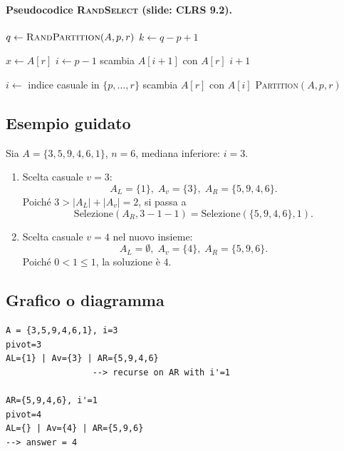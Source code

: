 \paragraph{Pseudocodice \textsc{RandSelect} (slide: CLRS 9.2).}
\begin{algorithm}[H]
	\caption{\textsc{RandSelect}$(A,p,r,i)$}
	$q\gets\textsc{RandPartition}(A,p,r)$\;
	$k\gets q-p+1$\;
\end{algorithm}

\begin{algorithm}[H]
	\caption{\textsc{Partition}$(A,p,r)$}
	$x\gets A[r]$\;
	$i\gets p-1$\;
	scambia $A[i+1]$ con $A[r]$\;
	\Return $i+1$\;
\end{algorithm}

\begin{algorithm}[H]
	\caption{\textsc{RandPartition}$(A,p,r)$}
	$i\gets$ indice casuale in $\{p,\ldots,r\}$\;
	scambia $A[r]$ con $A[i]$\;
	\Return \textsc{Partition}$(A,p,r)$\;
\end{algorithm}

\subsection{Esempio guidato}
Sia $A=\{3,5,9,4,6,1\}$, $n=6$, mediana inferiore: $i=3$.
\begin{enumerate}
	\item Scelta casuale $v=3$:
	\[
	A_L=\{1\},\;A_v=\{3\},\;A_R=\{5,9,4,6\}.
	\]
	Poiché $3>|A_L|+|A_v|=2$, si passa a
	\[
	\text{Selezione}(A_R,3-1-1)=\text{Selezione}(\{5,9,4,6\},1).
	\]
	\item Scelta casuale $v=4$ nel nuovo insieme:
	\[
	A_L=\emptyset,\;A_v=\{4\},\;A_R=\{5,9,6\}.
	\]
	Poiché $0<1\le1$, la soluzione è $4$.
\end{enumerate}

\subsection{Grafico o diagramma}
\begin{center}
\begin{verbatim}
A = {3,5,9,4,6,1}, i=3
pivot=3
AL={1} | Av={3} | AR={5,9,4,6}
                 --> recurse on AR with i'=1

AR={5,9,4,6}, i'=1
pivot=4
AL={} | Av={4} | AR={5,9,6}
--> answer = 4
\end{verbatim}
\end{center}

